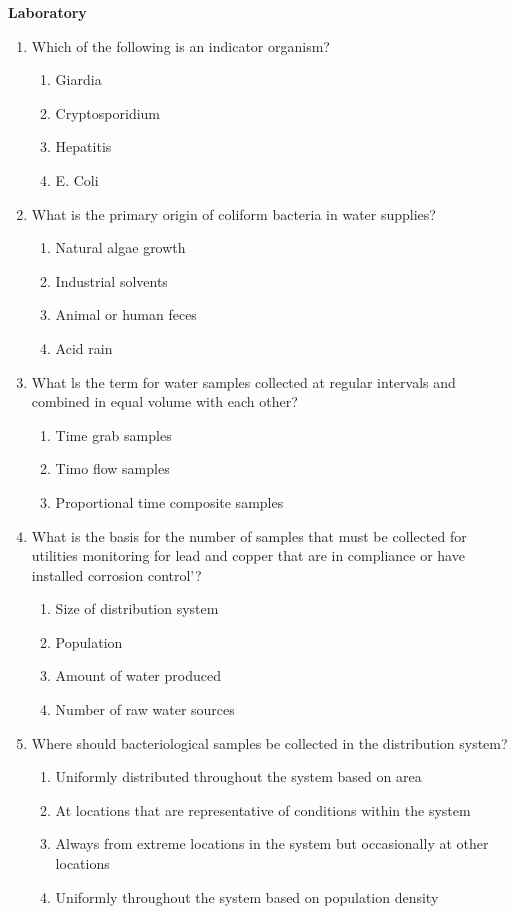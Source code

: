\documentclass{article}
\begin{document}
\newpage
\textbf{Laboratory}
\begin{enumerate}[1.]

\item Which of the following is an indicator organism?
\begin{enumerate}
\item Giardia
\item Cryptosporidium
\item Hepatitis
\item E. Coli
\end{enumerate}

\item 	What is the primary origin of coliform bacteria in water supplies?
\begin{enumerate}
\item 	Natural algae growth
\item 	Industrial solvents
\item 	Animal or human feces
\item 	Acid rain
\end{enumerate}

\item 	What ls the term for water samples collected at regular intervals and combined in equal volume with each other?
\begin{enumerate}
\item 	Time grab samples
\item 	Timo flow samples
\item Proportional time composite samples
\end{enumerate}

\item 	What is the basis for the number of samples that must be collected for utilities monitoring for lead and copper that are in compliance or have installed corrosion control'?
\begin{enumerate}
\item 	Size of distribution system
\item 	Population
\item 	Amount of water produced
\item 	Number of raw water sources
\end{enumerate}

\item 	Where should bacteriological samples be collected in the distribution system?
\begin{enumerate}
\item 	Uniformly distributed throughout the system based on area
\item 	At locations that are representative of conditions within the system
\item 	Always from extreme locations in the system but occasionally at other locations
\item 	Uniformly throughout the system based on population density
\end{enumerate}
 

\end{enumerate}
\end{document}

